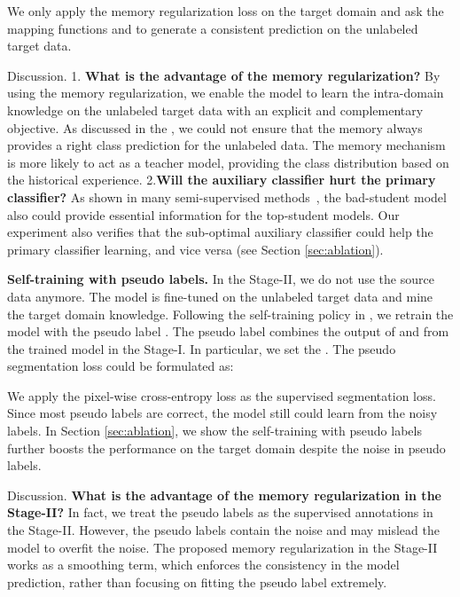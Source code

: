 \documentclass{article}
\begin{document}
We only apply the memory regularization loss on the target domain  and ask the mapping functions  and  to generate a consistent prediction on the unlabeled target data. 

\noindent Discussion. 
1. \textbf{What is the advantage of the memory regularization?} 
By using the memory regularization, we enable the model to learn the intra-domain knowledge on the unlabeled target data with an explicit and complementary objective.
As discussed in the \cite{tarvainen2017mean,chen2018semi}, we could not ensure that the memory always provides a right class prediction for the unlabeled data. The memory mechanism is more likely to act as a teacher model, providing the class distribution based on the historical experience. 2.\textbf{Will the auxiliary classifier hurt the primary classifier?} As shown in many semi-supervised methods~\cite{zhang2018deep,tarvainen2017mean}, the bad-student model also could provide essential information for the top-student models. Our experiment also verifies that the sub-optimal auxiliary classifier could help the primary classifier learning, and vice versa (see Section \ref{sec:ablation}). 

\noindent\textbf{Self-training with pseudo labels.}
In the Stage-II, we do not use the source data anymore. The model is fine-tuned on the unlabeled target data and mine the target domain knowledge. Following the self-training policy in \cite{zou2018unsupervised,zou2019confidence}, we retrain the model with the pseudo label . The pseudo label combines the output of  and  from the trained model in the Stage-I. In particular, we set the . 
The pseudo segmentation loss could be formulated as:

We apply the pixel-wise cross-entropy loss as the supervised segmentation loss. Since most pseudo labels are correct, the model still could learn from the noisy labels. In Section \ref{sec:ablation}, we show the self-training with pseudo labels further boosts the performance on the target domain despite  the noise in pseudo labels.

\noindent Discussion. 
\textbf{What is the advantage of the memory regularization in the Stage-II?} In fact, we treat the pseudo labels as the supervised annotations in the Stage-II. However, the pseudo labels contain the noise and may mislead the model to overfit the noise. The proposed memory regularization in the Stage-II works as a smoothing term, which enforces the consistency in the model prediction, rather than focusing on fitting the pseudo label extremely. 
\end{document}
